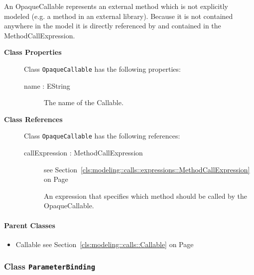 	
			
An OpaqueCallable represents an external method which is not explicitly modeled (e.g. a method in an external library). Because it is not contained anywhere in the model it is directly referenced by and contained in the MethodCallExpression.	
			
	
		
	


\begin{description}

	\item[\textbf{Class Properties}] Class \texttt{OpaqueCallable} has the following properties:
	\begin{description}
\item[name : EString 	]

\hspace{\fill}
\nopagebreak


	
			
The name of the Callable.	
		
	
	\end{description}
	
	\item[\textbf{Class References}] Class \texttt{OpaqueCallable} has the following references:
	\begin{description}
\item[callExpression : MethodCallExpression 	]
see Section~\ref{cls:modeling::calls::expressions::MethodCallExpression} on Page~\pageref{cls:modeling::calls::expressions::MethodCallExpression}
\hspace{\fill}
\nopagebreak


	
			
An expression that specifies which method should be called by the OpaqueCallable.	
		
	
	\end{description}
	

\end{description}

\paragraph{Parent Classes}
\begin{itemize}
\item Callable see Section~\ref{cls:modeling::calls::Callable} on Page~\pageref{cls:modeling::calls::Callable}\end{itemize}
\subsubsection{\Large{Class \bfseries \texttt{ParameterBinding}\normalfont}}
\label{cls:modeling::calls::ParameterBinding} 
